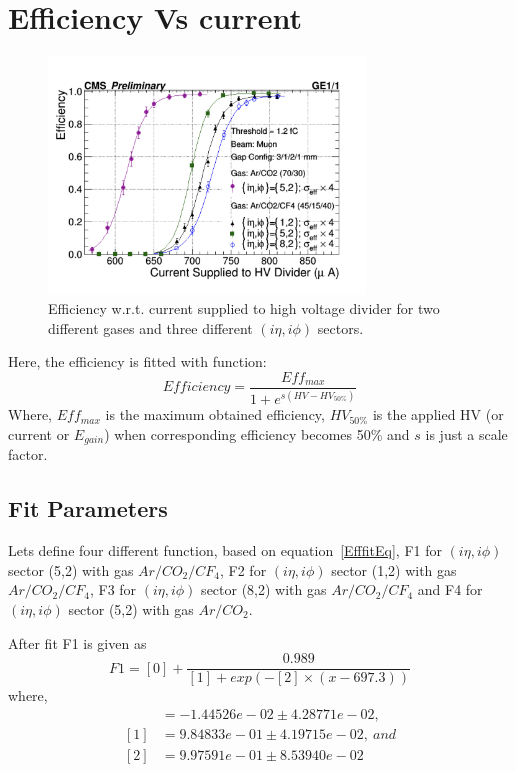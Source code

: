 \section{Efficiency Vs current} %
\label{sec:efficiency_vs_current}
\begin{figure}[!htbp]
\centering
\includegraphics[width=0.75\textwidth]{figures/GEM/Efficiency_Current.jpeg}
\caption{Efficiency w.r.t. current supplied to high voltage divider for two different gases and three different $(i\eta,i\phi)$ sectors.}
\label{Efficiency}
\end{figure}
Here, the efficiency is fitted with function:
\begin{equation}\label{EfffitEq}
    Efficiency = \frac{Eff_{max}}{1+e^{s(HV-HV_{50\%})}}
\end{equation}
Where, $Eff_{max}$ is the maximum obtained efficiency, $HV_{50\%}$ is the applied HV (or current or $E_{gain}$) when corresponding efficiency becomes 50\% and $s$ is just a scale factor.

\subsection{Fit Parameters} %
\label{sub:fit_parameters}
Lets define four different function, based on equation~\ref{EfffitEq}, F1 for $(i\eta,i\phi)$ sector (5,2) with gas $Ar/CO_2/CF_4$, F2 for $(i\eta,i\phi)$ sector (1,2) with gas $Ar/CO_2/CF_4$, F3 for $(i\eta,i\phi)$ sector (8,2) with gas $Ar/CO_2/CF_4$ and F4 for $(i\eta,i\phi)$ sector (5,2) with gas $Ar/CO_2$.

After fit F1 is given as
\begin{equation}
	F1 = [0] + \frac{0.989}{[1]+exp(-[2]\times(x-697.3))}
\end{equation}
where,
\begin{align*}
[0] &= -1.44526e-02 \pm 4.28771e-02,\\
[1] &= 9.84833e-01 \pm 4.19715e-02,~and \\
[2] &= 9.97591e-01 \pm 8.53940e-02
\end{align*}


